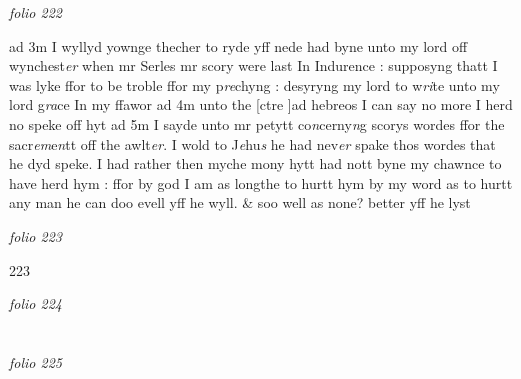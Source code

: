 \documentclass[12pt, a4paper]{book}
\begin{document}
\dotfill
					

\textit{folio 222}


ad 3m I wyllyd yownge thecher to ryde yff nede had byne unto my lord off wynchest\textit{er} when mr Serles mr scory were last In Indurence : supposyng thatt I was lyke ffor to be troble ffor my p\textit{re}chyng : desyryng my lord to w\textit{ri}te unto my lord g\textit{ra}ce In my ffawor ad 4m unto the [ctre ]ad hebreos I can say no more I herd no speke off hyt ad 5m I sayde unto mr petytt co\textit{n}cerny\textit{n}g scorys wordes ffor the sacr\textit{em}e\textit{n}tt off the awlt\textit{er}. I wold to J\textit{e}hu\textit{s} he had nev\textit{er} spake thos wordes that he dyd speke. I had rather then myche mony hytt had  nott byne my chawnce to have herd hym : ffor by god I am as longthe to hurtt hym by my word as to hurtt any man  he can doo evell yff he wyll. \& soo well as none? better yff he lyst

\dotfill
					

\textit{folio 223}


{\color{Mahogany}223}

\dotfill
					

\textit{folio 224}


         \vspace{4cm}
         
\dotfill
					  \section*{}

\textit{folio 225}
\end{document}

